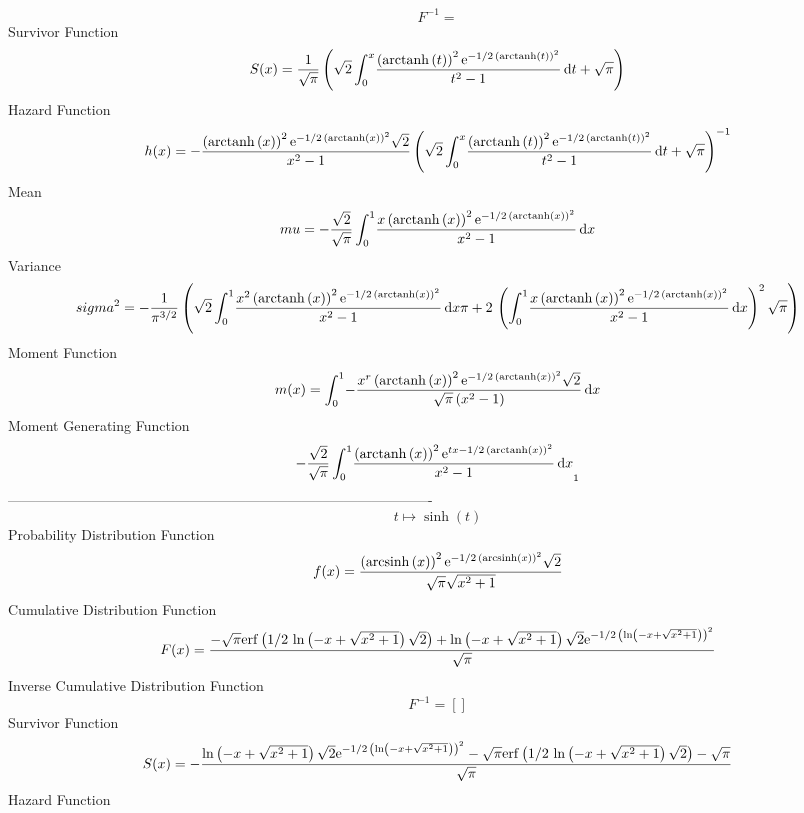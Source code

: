 \documentclass[12pt]{article}
\begin{document}
  $$F^{-1} = $$Survivor Function 
 $$ S(x)={\frac {1}{\sqrt {\pi}} \left( \sqrt {2}\int_{0}^{x}\!{\frac { \left( 
{\rm arctanh} \left(t\right) \right) ^{2}{{\rm e}^{-1/2\, \left( 
{\rm arctanh} \left(t\right) \right) ^{2}}}}{{t}^{2}-1}}\,{\rm d}t+
\sqrt {\pi} \right) }
$$ Hazard Function 
 $$ h(x)=-{\frac { \left( {\rm arctanh} \left(x\right) \right) ^{2}{{\rm e}^{-1
/2\, \left( {\rm arctanh} \left(x\right) \right) ^{2}}}\sqrt {2}}{{x}^
{2}-1} \left( \sqrt {2}\int_{0}^{x}\!{\frac { \left( {\rm arctanh} 
\left(t\right) \right) ^{2}{{\rm e}^{-1/2\, \left( {\rm arctanh} 
\left(t\right) \right) ^{2}}}}{{t}^{2}-1}}\,{\rm d}t+\sqrt {\pi}
 \right) ^{-1}}
$$Mean 
 $$ mu=-{\frac {\sqrt {2}}{\sqrt {\pi}}\int_{0}^{1}\!{\frac {x \left( 
{\rm arctanh} \left(x\right) \right) ^{2}{{\rm e}^{-1/2\, \left( 
{\rm arctanh} \left(x\right) \right) ^{2}}}}{{x}^{2}-1}}\,{\rm d}x}
$$ Variance 
 $$ sigma^2 = -{\frac {1}{{\pi}^{3/2}} \left( \sqrt {2}\int_{0}^{1}\!{\frac {{x}^{2}
 \left( {\rm arctanh} \left(x\right) \right) ^{2}{{\rm e}^{-1/2\,
 \left( {\rm arctanh} \left(x\right) \right) ^{2}}}}{{x}^{2}-1}}
\,{\rm d}x\pi+2\, \left( \int_{0}^{1}\!{\frac {x \left( {\rm arctanh} 
\left(x\right) \right) ^{2}{{\rm e}^{-1/2\, \left( {\rm arctanh} 
\left(x\right) \right) ^{2}}}}{{x}^{2}-1}}\,{\rm d}x \right) ^{2}
\sqrt {\pi} \right) }
$$Moment Function 
 $$ m(x) = \int_{0}^{1}\!-{\frac {{x}^{r} \left( {\rm arctanh} \left(x\right)
 \right) ^{2}{{\rm e}^{-1/2\, \left( {\rm arctanh} \left(x\right)
 \right) ^{2}}}\sqrt {2}}{\sqrt {\pi} \left( {x}^{2}-1 \right) }}
\,{\rm d}x
$$ Moment Generating Function 
 $$-{\frac {\sqrt {2}}{\sqrt {\pi}}\int_{0}^{1}\!{\frac { \left( 
{\rm arctanh} \left(x\right) \right) ^{2}{{\rm e}^{tx-1/2\, \left( 
{\rm arctanh} \left(x\right) \right) ^{2}}}}{{x}^{2}-1}}\,{\rm d}x}_{{
1}}
$$-------------------------------------------------------------------------------------------  \\$$t\mapsto \sinh \left( t \right) 
$$Probability Distribution Function 
$$  f(x)={\frac { \left( {\rm arcsinh} \left(x\right) \right) ^{2}{{\rm e}^{-1/
2\, \left( {\rm arcsinh} \left(x\right) \right) ^{2}}}\sqrt {2}}{
\sqrt {\pi}\sqrt {{x}^{2}+1}}}
$$Cumulative Distribution Function  
 $$F(x)={\frac {-\sqrt {\pi}{\rm erf} \left(1/2\,\ln  \left( -x+\sqrt {{x}^{2}
+1} \right) \sqrt {2}\right)+\ln  \left( -x+\sqrt {{x}^{2}+1} \right) 
\sqrt {2}{{\rm e}^{-1/2\, \left( \ln  \left( -x+\sqrt {{x}^{2}+1}
 \right)  \right) ^{2}}}}{\sqrt {\pi}}}
$$ Inverse Cumulative Distribution Function 
  $$F^{-1} = []
$$Survivor Function 
 $$ S(x)=-{\frac {\ln  \left( -x+\sqrt {{x}^{2}+1} \right) \sqrt {2}{{\rm e}^{-
1/2\, \left( \ln  \left( -x+\sqrt {{x}^{2}+1} \right)  \right) ^{2}}}-
\sqrt {\pi}{\rm erf} \left(1/2\,\ln  \left( -x+\sqrt {{x}^{2}+1}
 \right) \sqrt {2}\right)-\sqrt {\pi}}{\sqrt {\pi}}}
$$ Hazard Function 
\end{document}
